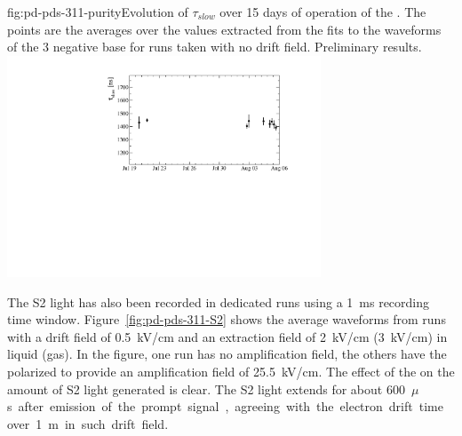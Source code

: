 \begin{dunefigure}{fig:pd-pds-311-purity}{Evolution of $\tau_{slow}$ over \num{15} days of operation of the . The points are the averages over the values extracted from the fits to the waveforms of the \num{3} negative base  for runs taken with no drift field. Preliminary results.}
\includegraphics[width=0.7\textwidth]{graphics/dppd_311_purity.pdf}
\end{dunefigure}

The S2 light has also been recorded in dedicated runs using a \SI{1}{ms} recording time window.
Figure~\ref{fig:pd-pds-311-S2} shows the average waveforms from runs with a drift field of \SI{0.5}{kV/cm} and an extraction field of \SI{2}{kV/cm} (\SI{3}{kV/cm}) in liquid (gas). In the figure, one run has no amplification field, the others have the  polarized to provide an amplification field of \SI{25.5}{kV/cm}. 
The effect of the  on the amount of S2 light generated is clear. 
The S2 light extends for about \SI{600}{$\mu$s} after emission of the prompt signal, agreeing with the electron drift time over \SI{1}{m} in such drift field.


